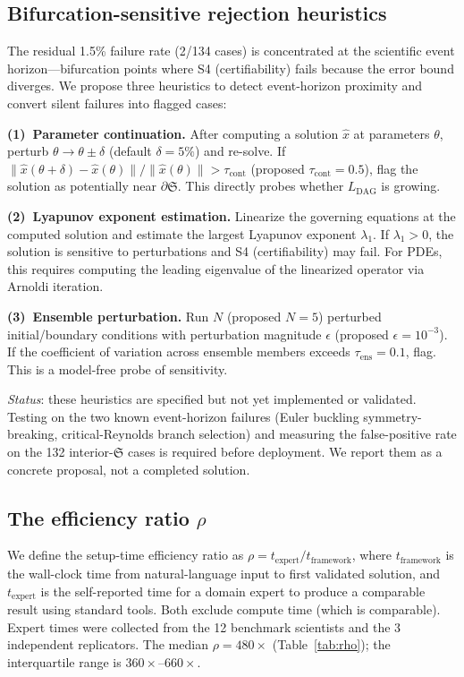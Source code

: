 \documentclass[11pt,a4paper]{article}
\newcommand{\Sclass}{\mathfrak{S}}
\begin{document}
\subsection{Bifurcation-sensitive rejection heuristics}
\label{sec:bifurcation}

The residual 1.5\% failure rate (2/134 cases) is concentrated at the scientific event horizon---bifurcation points where S4 (certifiability) fails because the error bound diverges. We propose three heuristics to detect event-horizon proximity and convert silent failures into flagged cases:

\textbf{(1)~Parameter continuation.} After computing a solution $\hat{x}$ at parameters $\theta$, perturb $\theta \to \theta \pm \delta$ (default $\delta = 5\%$) and re-solve. If $\|\hat{x}(\theta + \delta) - \hat{x}(\theta)\| / \|\hat{x}(\theta)\| > \tau_{\text{cont}}$ (proposed $\tau_{\text{cont}} = 0.5$), flag the solution as potentially near $\partial \Sclass$. This directly probes whether $L_{\text{DAG}}$ is growing.

\textbf{(2)~Lyapunov exponent estimation.} Linearize the governing equations at the computed solution and estimate the largest Lyapunov exponent $\lambda_1$. If $\lambda_1 > 0$, the solution is sensitive to perturbations and S4 (certifiability) may fail. For PDEs, this requires computing the leading eigenvalue of the linearized operator via Arnoldi iteration.

\textbf{(3)~Ensemble perturbation.} Run $N$ (proposed $N = 5$) perturbed initial/boundary conditions with perturbation magnitude $\epsilon$ (proposed $\epsilon = 10^{-3}$). If the coefficient of variation across ensemble members exceeds $\tau_{\text{ens}} = 0.1$, flag. This is a model-free probe of sensitivity.

\emph{Status}: these heuristics are specified but not yet implemented or validated. Testing on the two known event-horizon failures (Euler buckling symmetry-breaking, critical-Reynolds branch selection) and measuring the false-positive rate on the 132 interior-$\Sclass$ cases is required before deployment. We report them as a concrete proposal, not a completed solution.

\subsection{The efficiency ratio $\rho$}

We define the setup-time efficiency ratio as $\rho = t_{\text{expert}} / t_{\text{framework}}$, where $t_{\text{framework}}$ is the wall-clock time from natural-language input to first validated solution, and $t_{\text{expert}}$ is the self-reported time for a domain expert to produce a comparable result using standard tools. Both exclude compute time (which is comparable). Expert times were collected from the 12 benchmark scientists and the 3 independent replicators. The median $\rho = 480\times$ (Table~\ref{tab:rho}); the interquartile range is $360\times$--$660\times$.
\end{document}
